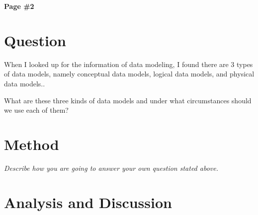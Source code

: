 \documentclass[12pt, a4paper]{article}
\begin{document}
\newpage

\begin{center}
{\textbf{
Page \#2}}
\end{center}

\section{Question}

When I looked up for the information of data modeling, I found there are 3 types of data models, namely conceptual data models, logical data models, and physical data models.\cite{wiki}.

What are these three kinds of data models and under what circumstances should we use each of them?

\section{Method}

{\emph{Describe how you are going to answer your own question stated above.}}

\section{Analysis and Discussion}



\end{document}
